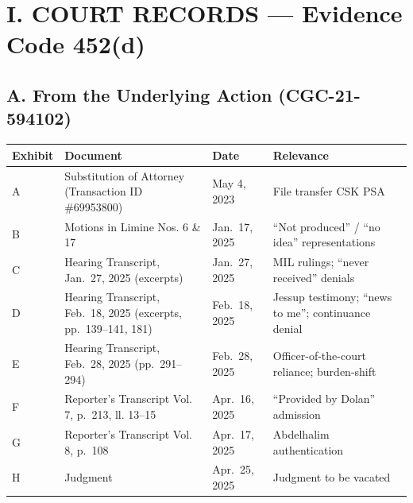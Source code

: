 \section{I. COURT RECORDS --- Evidence Code \textsection{} 452(d)}\label{i.-court-records-evidence-code-452d}

\subsection{A. From the Underlying Action (CGC-21-594102)}\label{a.-from-the-underlying-action-cgc-21-594102}

{\def\LTcaptype{table} %
\begin{longtable}[]{@{}
  >{\raggedright\arraybackslash}p{}
  >{\raggedright\arraybackslash}p{}
  >{\raggedright\arraybackslash}p{}
  >{\raggedright\arraybackslash}p{}@{}}
\toprule\noalign{}
\begin{minipage}[b]{\linewidth}\raggedright
Exhibit
\end{minipage} & \begin{minipage}[b]{\linewidth}\raggedright
Document
\end{minipage} & \begin{minipage}[b]{\linewidth}\raggedright
Date
\end{minipage} & \begin{minipage}[b]{\linewidth}\raggedright
Relevance
\end{minipage} \\
\midrule\noalign{}
\endhead
\bottomrule\noalign{}
\endlastfoot
A & Substitution of Attorney (Transaction ID \#69953800) & May 4, 2023 & File transfer CSK {\textrightarrow{}} PSA \\
B & Motions in Limine Nos. 6 \& 17 & Jan.~17, 2025 & ``Not produced'' / ``no idea'' representations \\
C & Hearing Transcript, Jan.~27, 2025 (excerpts) & Jan.~27, 2025 & MIL rulings; ``never received'' denials \\
D & Hearing Transcript, Feb.~18, 2025 (excerpts, pp.~139--141, 181) & Feb.~18, 2025 & Jessup testimony; ``news to me''; continuance denial \\
E & Hearing Transcript, Feb.~28, 2025 (pp.~291--294) & Feb.~28, 2025 & Officer-of-the-court reliance; burden-shift \\
F & Reporter's Transcript Vol. 7, p.~213, ll. 13--15 & Apr.~16, 2025 & ``Provided by Dolan'' admission \\
G & Reporter's Transcript Vol. 8, p.~108 & Apr.~17, 2025 & Abdelhalim authentication \\
H & Judgment & Apr.~25, 2025 & Judgment to be vacated \\
\end{longtable}
}

